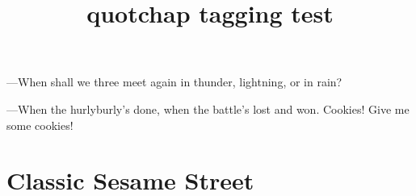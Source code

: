 \documentclass{report}
\title{quotchap tagging test}
\begin{document}
\begin{savequote}[45mm]
---When shall we three meet again
in thunder, lightning, or in rain?

---When the hurlyburly’s done,
when the battle’s lost and won.
Cookies! Give me some cookies!
\end{savequote}

\chapter{Classic Sesame Street}
\end{document}

